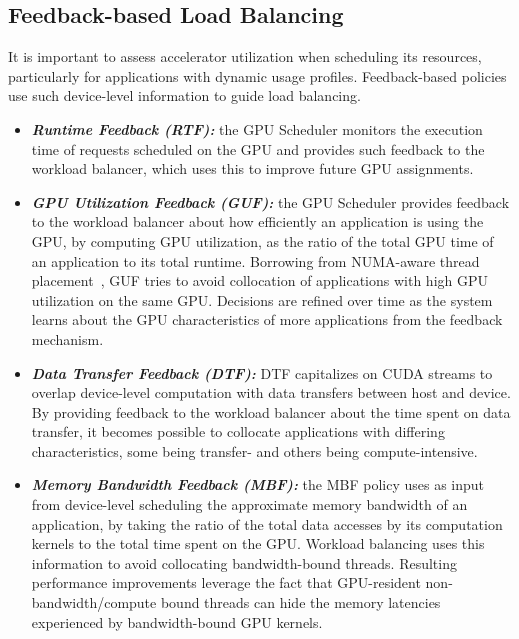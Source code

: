 \subsection{Feedback-based Load Balancing}
It is important to assess accelerator utilization when scheduling   its   resources,   particularly  for  applications  with dynamic usage profiles. Feedback-based policies use such device-level information to guide load balancing.
\begin{itemize}
\item \textbf{\textit{Runtime Feedback (RTF): }} the GPU Scheduler monitors the execution time of requests scheduled on the GPU and provides such feedback to the workload balancer, which uses this to improve future GPU assignments. 
\item \textbf{\textit{GPU Utilization Feedback (GUF): }}the   GPU  Scheduler provides  feedback  to  the workload balancer about how efficiently an application is using the GPU, by computing GPU utilization, as the ratio of the total GPU time of an application to its total runtime. Borrowing from NUMA-aware  thread placement~\cite{numa}, GUF tries to avoid collocation of applications with  high  GPU  utilization  on  the  same  GPU. Decisions are refined over time as the system learns about the GPU characteristics of more applications from the feedback mechanism.
\item \textbf{\textit{Data Transfer Feedback (DTF): }}DTF capitalizes on CUDA streams to overlap device-level computation with data transfers between host and device. By providing feedback to the workload balancer about the time spent on data transfer, it becomes possible to collocate applications with differing characteristics, some being transfer- and others being compute-intensive.
\item \textbf{\textit{ Memory Bandwidth Feedback (MBF): }}the MBF policy uses as input from device-level scheduling the approximate memory bandwidth of an application, by taking the ratio of the total data accesses by its computation kernels to the total time spent on the GPU. Workload balancing uses this information to avoid collocating   bandwidth-bound   threads.   Resulting   performance improvements leverage the fact that GPU-resident non-bandwidth/compute bound threads can hide the memory latencies experienced by bandwidth-bound GPU kernels.
\end{itemize}
